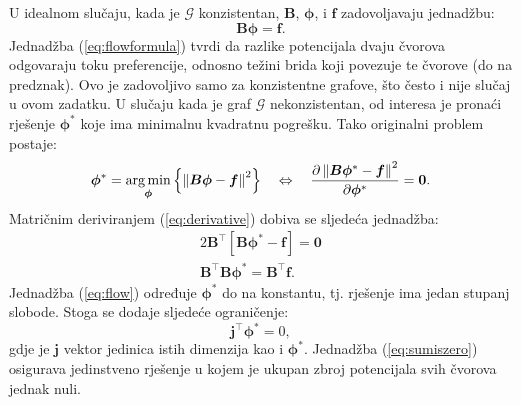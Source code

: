 \documentclass[lmodern, utf8, diplomski, numeric]{fer}
\newcommand{\matr}[1]{\mathbold{#1}}
\newcommand{\graph}[1]{\mathcal{#1}}
\newcommand{\T}{\top}
\newcommand{\q}{\left}
\newcommand{\w}{\right}
\DeclareMathOperator*{\argmin}{arg\min}
\begin{document}
  U idealnom slučaju, kada je $\graph{G}$ konzistentan, $\matr{B}$, $\matr{\phi}$, i $\matr{f}$ zadovoljavaju jednadžbu:
  \begin{equation}
  \label{eq:flowformula}
  \matr{B} \matr{\phi} = \matr{f}.
  \end{equation}
  Jednadžba (\ref{eq:flowformula}) tvrdi da razlike potencijala dvaju čvorova odgovaraju toku preferencije, odnosno težini brida koji povezuje te čvorove (do na predznak).
  Ovo je zadovoljivo samo za konzistentne grafove, što često i nije slučaj u ovom zadatku.
  U slučaju kada je graf $\graph{G}$ nekonzistentan, od interesa je pronaći rješenje $\matr{\phi^*}$ koje ima minimalnu kvadratnu pogrešku.
  Tako originalni problem postaje:
  \begin{gather}
  \label{eq:derivative}
  \matr{\phi^*} = \argmin_{\matr{\phi}} \q\{ \q \lVert \matr{B} \matr{\phi} - \matr{f}\textsl{} \w \rVert ^ 2 \w\} \quad
  \Leftrightarrow \quad 
  \frac{\partial \q \lVert \matr{B} \matr{\phi^*} - \matr{f} \w \rVert ^ 2}{\partial \matr{\phi^*}} = \mathbf{0}.
  \end{gather}
  Matričnim deriviranjem (\ref{eq:derivative}) dobiva se sljedeća jednadžba:
  \begin{gather}
  2 \matr{B}^\T \q[\matr{B} \matr{\phi^*} - \matr{f} \w] = \mathbf{0} \nonumber \\
  \label{eq:flow}
  \matr{B}^\T \matr{B} \matr{\phi^*} = \matr{B}^\T \matr{f}.
  \end{gather}
  Jednadžba (\ref{eq:flow}) određuje $\matr{\phi^*}$ do na konstantu, tj. rješenje ima jedan stupanj slobode.
  Stoga se dodaje sljedeće ograničenje:
  \begin{equation}
  \label{eq:sumiszero}
  \matr{j}^\T \matr{\phi^*} = 0,
  \end{equation}
  gdje je $\matr{j}$ vektor jedinica istih dimenzija kao i $\matr{\phi^*}$.
  Jednadžba (\ref{eq:sumiszero}) osigurava jedinstveno rješenje u kojem je ukupan zbroj potencijala svih čvorova jednak nuli.
  
\end{document}
